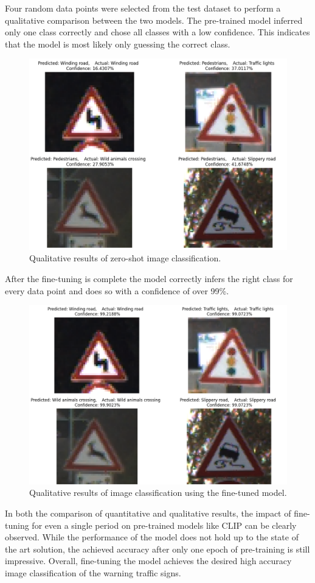 \documentclass{article}
\begin{document}
Four random data points were selected from the test dataset to perform a qualitative comparison between the two models. The pre-trained model inferred only one class correctly and chose all classes with a low confidence. This indicates that the model is most likely only guessing the correct class.
\begin{figure}[H]
    \centering
    \includegraphics[width=0.9\columnwidth]{images/quali_base.png}
    \caption{Qualitative results of zero-shot image classification.}
    \label{fig:quali_base}
\end{figure}
After the fine-tuning is complete the model correctly infers the right class for every data point and does so with a confidence of over 99\%.
\begin{figure}[H]
    \centering
    \includegraphics[width=0.9\columnwidth]{images/quali_fine_tuned.png}
    \caption{Qualitative results of image classification using the fine-tuned model.}
    \label{fig:quali_fine}
\end{figure}
In both the comparison of quantitative and qualitative results, the impact of fine-tuning for even a single period on pre-trained models like CLIP can be clearly observed. While the performance of the model does not hold up to the state of the art solution, the achieved accuracy after only one epoch of pre-training is still impressive. Overall, fine-tuning the model achieves the desired high accuracy image classification of the warning traffic signs.
\end{document}
